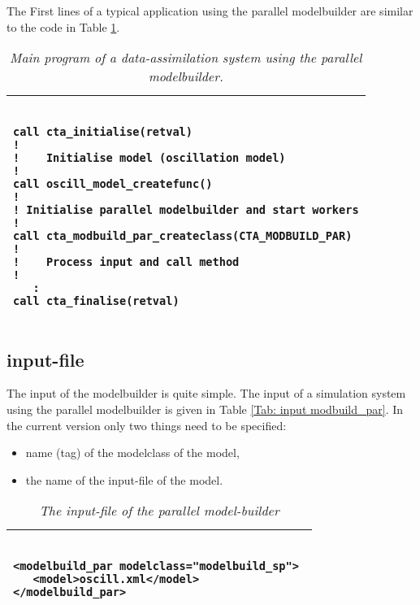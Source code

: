 The First lines of a typical application using the parallel modelbuilder
are similar to the code in Table \ref{Tab: main program}.


\begin{table}[ht]
\begin{tabular}{|l|}
\hline
\begin{minipage}{16cm}
\begin{verbatim}

call cta_initialise(retval)
!
!    Initialise model (oscillation model)
!
call oscill_model_createfunc()
!
! Initialise parallel modelbuilder and start workers
!
call cta_modbuild_par_createclass(CTA_MODBUILD_PAR)
!
!    Process input and call method
!     
   :
call cta_finalise(retval)

\end{verbatim}
\end{minipage}
\\
\hline
\end{tabular}
\caption{\em Main program of a data-assimilation system using the parallel
modelbuilder.}
\label{Tab: main program}
\end{table}


\subsection{input-file} \label{Sec:input-file}
The input of the modelbuilder is quite simple. The input of a simulation
system using the parallel modelbuilder is given in Table \ref{Tab: input
modbuild_par}. In the current version only two things need to
be specified:
\begin{itemize}
\item name (tag) of the modelclass of the model,
\item the name of the input-file of the model.
\end{itemize}


\begin{table}[h]
\begin{tabular}{|l|}
\hline
\begin{minipage}{16cm}
\begin{verbatim}

<modelbuild_par modelclass="modelbuild_sp"> 
   <model>oscill.xml</model>
</modelbuild_par> 

\end{verbatim}
\end{minipage}
\\
\hline
\end{tabular}
\caption{\em The input-file of the parallel model-builder}
\label{Tab: input modbuild_par}
\end{table}

